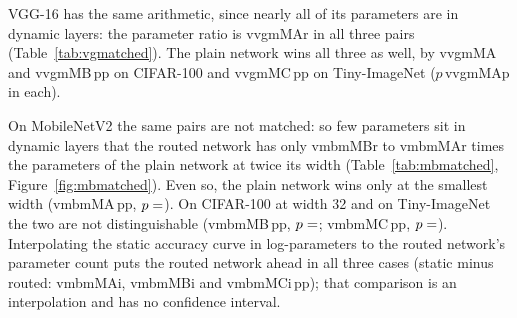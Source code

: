 \documentclass[10pt,a4paper]{article}
\newcommand{\V}[1]{\csname v#1\endcsname}
\begin{document}
VGG-16 has the same arithmetic, since nearly all of its parameters are in
dynamic layers: the parameter ratio is \V{vgmMAr} in all three pairs
(Table~\ref{tab:vgmatched}). The plain network wins all three as well, by
\V{vgmMA} and \V{vgmMB}\,pp on CIFAR-100 and \V{vgmMC}\,pp on
Tiny-ImageNet ($p$\,\V{vgmMAp} in each).

On MobileNetV2 the same pairs are not matched: so few parameters sit in
dynamic layers that the routed network has only \V{mbmMBr} to \V{mbmMAr}
times the parameters of the plain network at twice its width
(Table~\ref{tab:mbmatched}, Figure~\ref{fig:mbmatched}). Even so, the
plain network wins only at the smallest width (\V{mbmMA}\,pp,
$p=\V{mbmMAp}$). On CIFAR-100 at width 32 and on Tiny-ImageNet the two are
not distinguishable (\V{mbmMB}\,pp, $p=\V{mbmMBp}$; \V{mbmMC}\,pp,
$p=\V{mbmMCp}$). Interpolating the static accuracy curve in
log-parameters to the routed network's parameter count puts the routed
network ahead in all three cases (static minus routed: \V{mbmMAi},
\V{mbmMBi} and \V{mbmMCi}\,pp); that comparison is an interpolation and has
no confidence interval.

\begin{table}[!htbp]\centering\small
\caption{ResNet-18: routed against plain networks at matched parameter counts,
paired by seed. Minutes are routed / plain per run. The last column is
the routed network's stored parameters divided by the plain one's; a pair
is called matched only within 10\,\%.}
\label{tab:matched}
\end{table}
\end{document}
